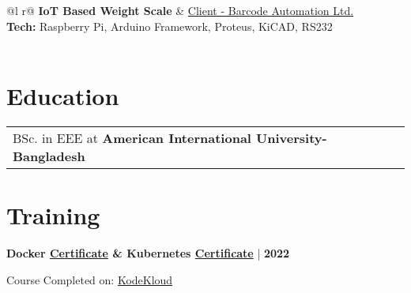 \documentclass {article}
\begin{document}
\begin{tabularx}{\linewidth}{ @{}l r@{} }
    \Large\textbf{IoT Based Weight Scale} & \hfill \href{https://barcodetech-automation.com/}{Client - Barcode Automation Ltd.} \\[3.75pt]  
    \textbf{Tech:} Raspberry Pi, Arduino Framework, Proteus, KiCAD, RS232 \\[3.75pt]
      \\
\end{tabularx}


\section{Education}
\begin{tabularx}{\linewidth}{@{}l X@{}}	
BSc. in EEE at \textbf{American International University-Bangladesh} \hfill \normalsize \\
\end{tabularx}

\section{Training}

    \begin{minipage}[t]{0.7\textwidth}
         \large \textbf{Docker \href{https://kodekloud.com/certificate-verification/73614B2C60-735B546104-735B181BB8/}{Certificate} \& Kubernetes \href{https://kodekloud.com/certificate-verification/73614B2C60-735B5486E3-735B181BB8/}{Certificate}} | \textbf{2022}
    \end{minipage}

    \begin{minipage}[t]{0.5\textwidth}
         Course Completed on: \href{https://kodekloud.com/}{KodeKloud}
    \end{minipage}    
    
\end{document}

